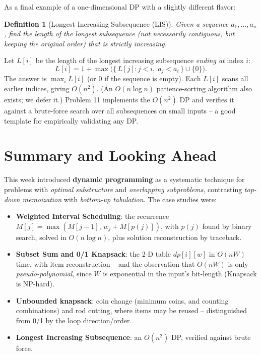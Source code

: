 \documentclass[11pt]{article}
\newtheorem{definition}[theorem]{Definition}
\begin{document}
As a final example of a one-dimensional DP with a slightly different flavor:

\begin{definition}[Longest Increasing Subsequence (LIS)]
Given a sequence $a_1, \ldots, a_n$, find the length of the longest subsequence (not
necessarily contiguous, but keeping the original order) that is strictly increasing.
\end{definition}

Let $L[i]$ be the length of the longest increasing subsequence \emph{ending at} index $i$:
\[
L[i] = 1 + \max\bigl(\{\,L[j] : j < i,\; a_j < a_i\,\} \cup \{0\}\bigr).
\]
The answer is $\max_i L[i]$ (or $0$ if the sequence is empty). Each $L[i]$ scans all
earlier indices, giving $O(n^2)$. (An $O(n \log n)$ patience-sorting algorithm also exists;
we defer it.) Problem 11 implements the $O(n^2)$ DP and verifies it against a brute-force
search over all subsequences on small inputs -- a good template for empirically validating
any DP.

\section{Summary and Looking Ahead}

This week introduced \textbf{dynamic programming} as a systematic technique for problems
with \emph{optimal substructure} and \emph{overlapping subproblems}, contrasting
\emph{top-down memoization} with \emph{bottom-up tabulation}. The case studies were:

\begin{itemize}
    \item \textbf{Weighted Interval Scheduling}: the recurrence $M[j] = \max(M[j-1],\,
    w_j + M[p(j)])$, with $p(j)$ found by binary search, solved in $O(n \log n)$, plus
    solution reconstruction by traceback.
    \item \textbf{Subset Sum and 0/1 Knapsack}: the 2-D table $\mathit{dp}[i][w]$ in
    $O(nW)$ time, with item reconstruction -- and the observation that $O(nW)$ is only
    \emph{pseudo-polynomial}, since $W$ is exponential in the input's bit-length (Knapsack
    is NP-hard).
    \item \textbf{Unbounded knapsack}: coin change (minimum coins, and counting
    combinations) and rod cutting, where items may be reused -- distinguished from 0/1 by
    the loop direction/order.
    \item \textbf{Longest Increasing Subsequence}: an $O(n^2)$ DP, verified against brute
    force.
\end{itemize}
\end{document}
